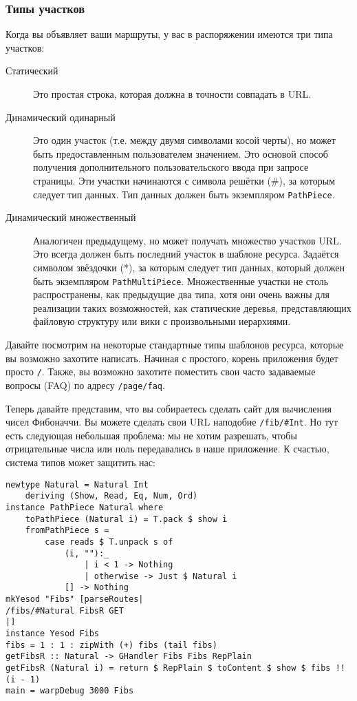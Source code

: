 \subsubsection{Типы участков}
Когда вы объявляет ваши маршруты, у вас в распоряжении имеются три
типа участков:
\begin{description}
\item[Статический]
Это простая строка, которая должна в точности совпадать в URL.

\item[Динамический одинарный]
Это один участок (т.е. между двумя символами косой черты), но может
быть предоставленным пользователем значением. Это основой способ
получения дополнительного пользовательского ввода при запросе
страницы. Эти участки начинаются с символа решётки (\#), за которым
следует тип данных. Тип данных должен быть экземпляром
\lstinline!PathPiece!.

\item [Динамический множественный]
Аналогичен предыдущему, но может получать множество участков URL. Это
всегда должен быть последний участок в шаблоне ресурса. Задаётся
символом звёздочки (*), за которым следует тип данных, который должен
быть экземпляром \lstinline!PathMultiPiece!. Множественные участки не
столь распространены, как предыдущие два типа, хотя они очень важны
для реализации таких возможностей, как статические деревья,
представляющих файловую структуру или вики с произвольными иерархиями.
\end{description}

Давайте посмотрим на некоторые стандартные типы шаблонов ресурса,
которые вы возможно захотите написать. Начиная с простого, корень
приложения будет просто \lstinline!/!. Также, вы возможно захотите
поместить свои часто задаваемые вопросы (FAQ) по адресу
\lstinline!/page/faq!.

Теперь давайте представим, что вы собираетесь сделать сайт для
вычисления чисел Фибоначчи. Вы можете сделать свои URL наподобие
\lstinline!/fib/#Int!. Но тут есть следующая небольшая проблема: мы не
хотим разрешать, чтобы отрицательные числа или ноль передавались в
наше приложение. К счастью, система типов может защитить нас:
\begin{lstlisting}
newtype Natural = Natural Int
    deriving (Show, Read, Eq, Num, Ord)
instance PathPiece Natural where
    toPathPiece (Natural i) = T.pack $ show i
    fromPathPiece s =
        case reads $ T.unpack s of
            (i, ""):_
                | i < 1 -> Nothing
                | otherwise -> Just $ Natural i
            [] -> Nothing
mkYesod "Fibs" [parseRoutes|
/fibs/#Natural FibsR GET
|]
instance Yesod Fibs
fibs = 1 : 1 : zipWith (+) fibs (tail fibs)
getFibsR :: Natural -> GHandler Fibs Fibs RepPlain
getFibsR (Natural i) = return $ RepPlain $ toContent $ show $ fibs !! (i - 1)
main = warpDebug 3000 Fibs
\end{lstlisting}

